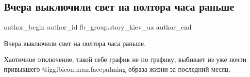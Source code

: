  
 
 
 
 
 
\subsection{Вчера выключили свет на полтора часа раньше}
\label{sec:13_11_2022.fb.fb_group.story_kiev_ua.1.svet}
 
\ifcmt
 author_begin
   author_id fb_group.story_kiev_ua
 author_end
\fi

Вчера выключили свет на полтора часа раньше.

Хаотичное отключение, такой себе график не по графику, выбивает из уже почти
привыкшего  @igg{fbicon.man.facepalming}  образа жизни за последний месяц. 


